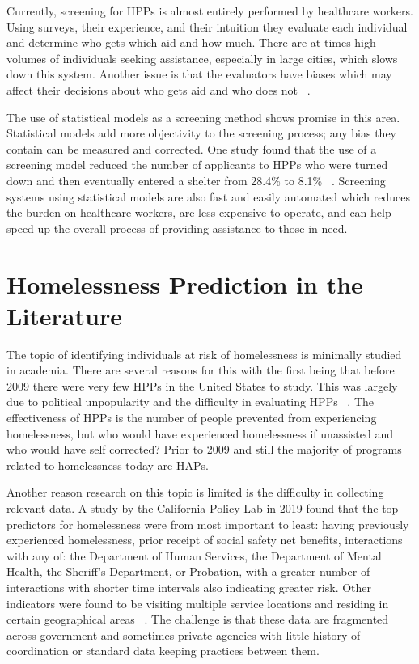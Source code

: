 \documentclass[10pt,letterpaper]{article}
\begin{document}
Currently, screening for HPPs is almost entirely performed by healthcare workers. Using surveys, their experience, and their intuition they evaluate each individual and determine who gets which aid and how much. There are at times high volumes of individuals seeking assistance, especially in large cities, which slows down this system. Another issue is that the evaluators have biases which may affect their decisions about who gets aid and who does not ~\cite{shinn2019homelessness}.

The use of statistical models as a screening method shows promise in this area. Statistical models add more objectivity to the screening process; any bias they contain can be measured and corrected. One study found that the use of a screening model reduced the number of applicants to HPPs who were turned down and then eventually entered a shelter from 28.4\% to 8.1\% ~\cite{shinn2019homelessness}. Screening systems using statistical models are also fast and easily automated which reduces the burden on healthcare workers, are less expensive to operate, and can help speed up the overall process of providing assistance to those in need.

\section{Homelessness Prediction in the Literature}
The topic of identifying individuals at risk of homelessness is minimally studied in academia. There are several reasons for this with the first being that before 2009 there were very few HPPs in the United States to study. This was largely due to political unpopularity and the difficulty in evaluating HPPs ~\cite{colburn2014federal}. The effectiveness of HPPs is the number of people prevented from experiencing homelessness, but who would have experienced homelessness if unassisted and who would have self corrected? Prior to 2009 and still the majority of programs related to homelessness today are HAPs. 

Another reason research on this topic is limited is the difficulty in collecting relevant data. A study by the California Policy Lab in 2019 found that the top predictors for homelessness were from most important to least: having previously experienced homelessness, prior receipt of social safety net benefits, interactions with any of: the Department of Human Services, the Department of Mental Health, the Sheriff's Department, or Probation, with a greater number of interactions with shorter time intervals also indicating greater risk. Other indicators were found to be visiting multiple service locations and residing in certain geographical areas ~\cite{PredictPreventHmlsnsLA}. The challenge is that these data are fragmented across government and sometimes private agencies with little history of coordination or standard data keeping practices between them.
\end{document}
